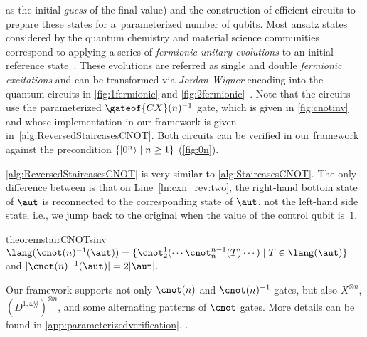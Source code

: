 \figCXnInv    %
\noindent
as the initial \emph{guess} of the final value) and the construction of
efficient circuits to prepare these states for a~parameterized number of
qubits.
Most ansatz states considered by the quantum chemistry and material science
communities correspond to applying a series of \emph{fermionic unitary
evolutions} to an initial reference state~\cite{YordanovADB20}.
These evolutions are referred as single and double \emph{fermionic
excitations} and can be transformed via \emph{Jordan-Wigner} encoding into the
quantum circuits in \cref{fig:1fermionic} and \cref{fig:2fermionic}~\cite{YordanovADB20}.
Note that the circuits use the parameterized $\gateof{CX}(n)^{-1}$ gate, which
is given in \cref{fig:cnotinv} and whose implementation in our framework is
given in~\cref{alg:ReversedStaircasesCNOT}.
Both circuits can be verified in our framework against the precondition $\{\ket{0^n}\mid n \geq 1\}$ (\cref{fig:0n}).
%




\algReverseStaircasesCNOT 

\cref{alg:ReversedStaircasesCNOT} is very similar to \cref{alg:StaircasesCNOT}. The only
difference between is that on Line~\ref{ln:cxn_rev:two}, the right-hand bottom state of $\overline \aut$ is
reconnected to the corresponding state of $\aut$, not the left-hand side state,
i.e., we jump back to the original \lsta when the value of the control qubit is~$1$.



{
\small
 \begin{restatable}{theorem}{stairCNOTsinv}\label{thm:stairCNOTsinv} 
 $
 \lang( \cnot(n)^{-1}(\aut) )  = \{\cnot^{1}_2(\cdots \cnot^{n-1}_n (T)\cdots ) \mid  T\in \lang(\aut) \}
 $
 and $|\cnot(n)^{-1}(\aut)| = 2|\aut|$.
 \end{restatable}
}

  Our framework supports not only $\cnot(n)$ and $\cnot(n)^{-1}$ gates,
but also $X^{\otimes n}$, $(D^{1, \omega^m_N})^{\otimes n}$,
and some alternating patterns of $\cnot$ gates. More details can be found in
\ifTR
\cref{app:parameterizedverification}.
\else
\cite{techrep}.
\fi


